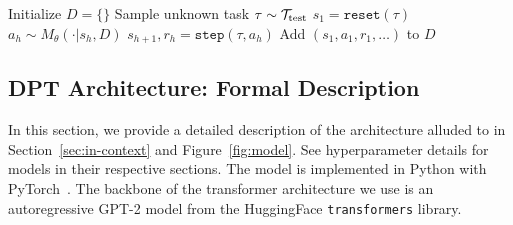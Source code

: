 \begin{algorithm}
\caption{Online test-time deployment (detailed)} 
\begin{algorithmic}[1]
        \STATE {}
        \STATE Initialize $D = \{\}$
        \STATE Sample unknown task $\tau \sim {\mathcal{T}}_{\text{test}}$
            \STATE $s_1 = \texttt{reset}(\tau)$
                \STATE $a_h \sim M_{\theta}(\cdot | s_h, D)$ 
                \STATE $s_{h + 1}, r_h = \texttt{step}(\tau, a_h)$
            \ENDFOR
            \STATE {}
            \STATE Add $(s_1, a_1, r_1, \ldots)$ to $D$
        \ENDFOR
            
\end{algorithmic}
\end{algorithm}

	


\subsection{DPT Architecture: Formal Description}
\label{app:implementation}

In this section, we provide a detailed description of the architecture alluded to in Section~\ref{sec:in-context} and Figure~\ref{fig:model}. See hyperparameter details for models in their respective sections. The model is implemented in Python with PyTorch~\citep{paszke2019pytorch}. The backbone of the transformer architecture we use is an autoregressive GPT-2 model from the HuggingFace \texttt{transformers} library. 

